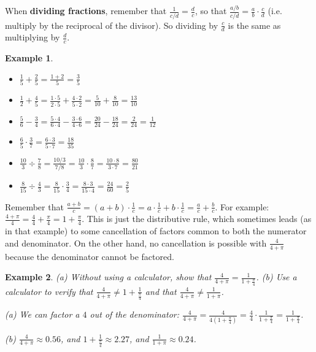 \documentclass[11pt]{book}               %
\newtheorem{example}{Example}
\begin{document}
 When {\bf dividing fractions}, remember that $ \frac{1}{ c/d} = \frac{d}{c}$, so that $ \frac{a/b}{c/d} =  \frac{a}{b} \cdot \frac{c}{d} $  (i.e. multiply by the reciprocal of the divisor).  So dividing by $\frac{c}{d}$ is the same as multiplying by $\frac{d}{c}$.

\begin{example}
$ $
\begin{itemize}
\item $ \frac{1}{5} + \frac{2}{5} = \frac{1+2}{5}=\frac{3}{5}$
\item $ \frac{1}{2} + \frac{4}{5} = \frac{1 \cdot 5}{2 \cdot 5}+ \frac{4 \cdot 2}{5 \cdot 2} = \frac{5}{10} + \frac{8}{10} = \frac{13}{10}$
\item $ \frac{5}{6} - \frac{3}{4} = \frac{5 \cdot 4}{6 \cdot 4} - \frac{3 \cdot 6}{4 \cdot 6} = \frac{20}{24} - \frac{18}{24} = \frac{2}{24} = \frac{1}{12}$
\item $ \frac{6}{5} \cdot \frac{3}{7} = \frac{6 \cdot 3}{5 \cdot 7} = \frac{18}{35}$
\item $ \frac{10}{3} \div \frac{7}{8} = \frac{10/3}{7/8}  = \frac{10}{3} \cdot \frac{8}{7} = \frac{10 \cdot 8}{3 \cdot 7} = \frac{80}{21} $
\item $ \frac{8}{15} \div \frac{4}{3} = \frac{8}{15} \cdot \frac{3}{4} = \frac{8 \cdot 3}{15 \cdot 4} = \frac{24}{60} = \frac{2}{5} $
\end{itemize}
\end{example}


Remember that $\frac{a+b}{c}=(a+b)\cdot\frac{1}{c}=a\cdot\frac{1}{c}+b\cdot\frac{1}{c}=\frac{a}{c}+\frac{b}{c}$. For example:
$\frac{4+\pi}{4}=\frac{4}{4}+\frac{\pi}{4}=1+\frac{\pi}{4}$. This is just the distributive rule, which sometimes leads (as in that example) to some cancellation of factors common to both the numerator and denominator. 
On the other hand, no cancellation is possible with $\frac{4}{4+\pi}$ because the denominator cannot be factored.

\begin{example}\label{dontcancle}
(a) Without using a calculator, show that $\frac{4}{4+\pi}=\frac{1}{1+\frac{\pi}{4}}$. (b) Use a calculator to verify that $\frac{4}{4+\pi}\neq 1 + \displaystyle\frac{1}{\frac{\pi}{4}}$ and that $\frac{4}{4+\pi}\neq\frac{1}{1+\pi}$.

\normalfont
(a) We can factor a $4$ out of the denominator: $\frac{4}{4+\pi}=\frac{4}{4\left(1+\frac{\pi}{4}\right)}=\frac{4}{4}\cdot\frac{1}{1+\frac{\pi}{4}} = \frac{1}{1+\frac{\pi}{4}}$.

(b) $\frac{4}{4+\pi}\approx 0.56$, and $1+\frac{1}{\frac{\pi}{4}}\approx2.27$, and $\frac{1}{1+\pi}\approx0.24$.
\end{example}
\end{document}
